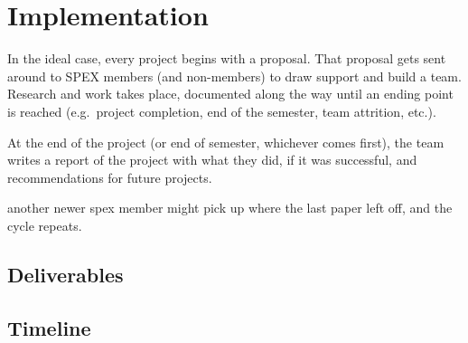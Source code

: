 \documentclass[journal]{SPEXformat}
\begin{document}
\section{Implementation}
\label{sec:implementation}
In the ideal case, every project begins with a proposal.
That proposal gets sent around to SPEX members (and non-members) to draw support and build a team.
Research and work takes place, documented along the way until  an ending point is reached (e.g.\ project completion, end of the semester, team attrition, etc.).

At the end of the project (or end of semester, whichever comes first), the team writes a report of the project with what they did, if it was successful, and recommendations for future projects.

another newer spex member might pick up where the last paper left off, and the cycle repeats.

\subsection{Deliverables}
\label{subsec:deliverables}
\subsection{Timeline}
\label{subsec:timeline}


\end{document}
